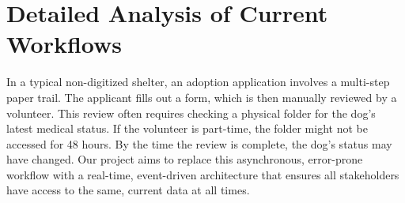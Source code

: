 \section{Detailed Analysis of Current Workflows}
In a typical non-digitized shelter, an adoption application involves a multi-step paper trail. The applicant fills out a form, which is then manually reviewed by a volunteer. This review often requires checking a physical folder for the dog's latest medical status. If the volunteer is part-time, the folder might not be accessed for 48 hours. By the time the review is complete, the dog's status may have changed. Our project aims to replace this asynchronous, error-prone workflow with a real-time, event-driven architecture that ensures all stakeholders have access to the same, current data at all times.
